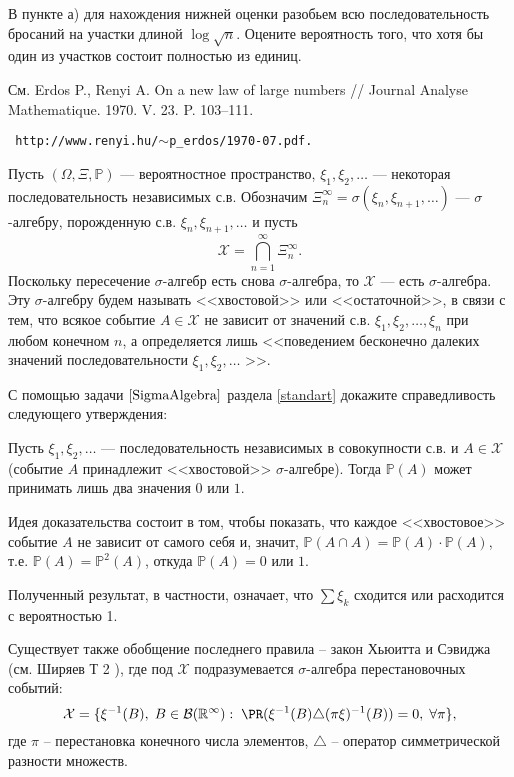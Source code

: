  \begin{ordre}
 В пункте а) для нахождения нижней оценки разобьем всю последовательность бросаний на участки длиной $\log \sqrt{n}$. Оцените вероятность того, что хотя бы один из участков состоит полностью из единиц.    
 \end{ordre}

\begin{remark}
 См. Erdos P., Renyi A. On a new law of large numbers // Journal Analyse Mathematique. 1970. V. 23. P. 103--111.
 
 \verb| http://www.renyi.hu/|$\sim$\verb|p_erdos/1970-07.pdf.| 
\end{remark}


\begin{problem}[Закон 0 и 1]
Пусть $(\Omega,\Xi,{\mathbb P})$ --- вероятностное пространство, $\xi_1,\xi_2,\ldots$ --- некоторая последовательность независимых с.в. 
Обозначим $\Xi_n^{\infty}=\sigma(\xi_{n},\xi_{n+1},\ldots)$ --- $\sigma$-алгебру, порожденную с.в. $\xi_{n},\xi_{n+1},\ldots$ и пусть 
$$
{\mathcal X}=\bigcap\limits_{n=1}^{\infty} \Xi_{n}^{\infty} . 
$$
Поскольку пересечение $\sigma$-алгебр есть снова $\sigma$-алгебра, то ${\mathcal X}$ --- есть $\sigma$-алгебра. Эту $\sigma$-алгебру 
будем называть <<хвостовой>> или <<остаточной>>, в связи с тем, что всякое событие $A\in{\mathcal X}$ не зависит от значений с.в. 
$\xi_1,\xi_2,\ldots,\xi_n$ при любом конечном $n$, а определяется лишь <<поведением бесконечно далеких значений последовательности 
$\xi_1,\xi_2,\ldots$ >>. 

С помощью задачи $\ref{SigmaAlgebra}$ раздела \ref{standart} докажите справедливость следующего утверждения: 

Пусть $\xi_1,\xi_2,\ldots$ --- последовательность независимых в совокупности с.в. и $A\in{\mathcal X}$ 
(событие $A$ принадлежит <<хвостовой>> $\sigma$-алгебре). Тогда ${\mathbb P}(A)$ может принимать лишь два значения $0$ или $1$. 
\end{problem}

\begin{ordre}
Идея доказательства состоит в том, чтобы показать, что каждое <<хвостовое>> событие $A$ не зависит от самого себя и, значит, 
${\mathbb P}(A\cap A)={\mathbb P}(A)\cdot {\mathbb P}(A)$, т.е. ${\mathbb P}(A)={\mathbb P}^2(A)$, откуда 
${\mathbb P}(A)=0$ или $1$. 

Полученный результат, в частности, означает, что $\sum  \xi_k$ сходится или расходится с вероятностью 1.  

Существует также обобщение последнего правила -- закон Хьюитта и Сэвиджа (см. Ширяев Т 2 \cite{21}), где под ${\mathcal X}$ подразумевается $\sigma$-алгебра перестановочных событий:
\[
\mathcal{X} = \{ \xi^{-1}(B), \; B \in \mathcal{B}(\mathbb{R}^{\infty}): \;
\PR (\xi^{-1}(B) \triangle (\pi\xi)^{-1}(B)) = 0, \; \forall \pi \}, 
\] 
где $\pi$ -- перестановка конечного числа элементов, $\triangle$ -- оператор симметрической разности множеств.
\end{ordre}

